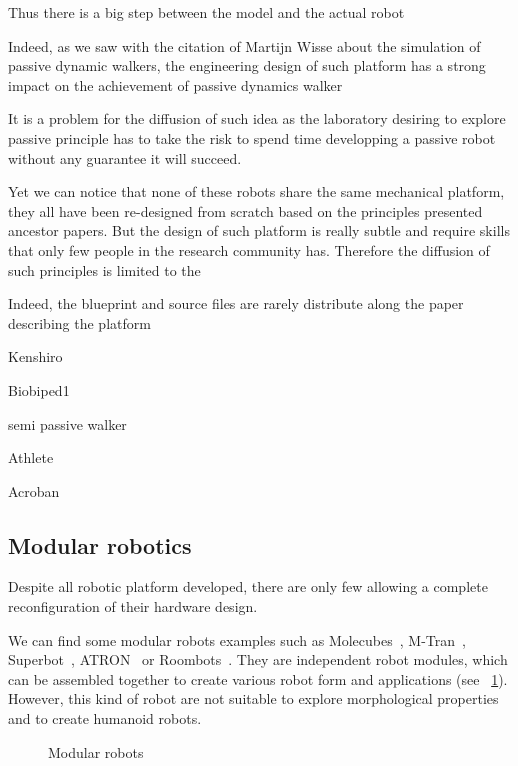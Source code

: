 Thus there is a big step between the model and the actual robot

Indeed, as we saw with the citation of Martijn Wisse about the simulation of passive dynamic walkers, the engineering design of such platform has a strong impact on the achievement of passive dynamics walker

It is a problem for the diffusion of such idea as the laboratory desiring to explore passive principle has to take the risk to spend time developping a passive robot without any guarantee it will succeed.


Yet we can notice that none of these robots share the same mechanical platform, they all have been re-designed from scratch based on the principles presented ancestor papers. But the design of such platform is really subtle and require skills that only few people in the research community has. Therefore the diffusion of such principles is limited to the

Indeed, the blueprint and source files are rarely distribute along the paper describing the platform




Kenshiro

Biobiped1

semi passive walker

Athlete

Acroban

\subsection{Modular robotics} %

Despite all robotic platform developed, there are only few allowing a complete reconfiguration of their hardware design.

We can find some modular robots examples such as Molecubes~\parencite{zykov2007molecubes}, M-Tran~\parencite{murata2002m}, Superbot~\parencite{salemi2006superbot}, ATRON~\parencite{jorgensen2004modular} or Roombots~\parencite{sproewitz2009roombots}. They are independent robot modules, which can be assembled together to create various robot form and applications (see \figurename~\ref{fig:modular-robots}). However, this kind of robot are not suitable to explore morphological properties and to create humanoid robots.

\begin{figure}[tb]
\centering
    \hfil
    \caption{Modular robots}
    \label{fig:modular-robots}
\end{figure}

